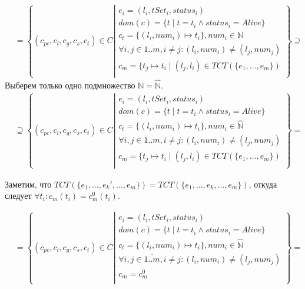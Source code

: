 \begin{align}
& = \left\lbrace (c_{pc},c_l,c_g,c_s, c_t) \in C 
\left| 
\begin{array}{c}
e_i = (l_i, tSet_i, status_i) \\
dom(c) = \{t \mid t = t_i \land status_i = Alive\}\\
c_t = \{(l_i, num_i) \mapsto t_i\}, num_i \in \mathbb{N} \\
\forall i, j \in \overline{1..m}, i \neq j: (l_i, num_i) \neq (l_j, num_j)\\
c_m = \{ t_j \mapsto t_i \mid (l_j, l_i) \in TCT(\{e_1, \dots, e_m\}) \\
\end{array}
\right.
\right\rbrace \supseteq \nonumber
\end{align}
Выберем только одно подмножество $\mathbb{N} = \widehat{\mathbb{N}}$.
\begin{align}
& \supseteq \left\lbrace (c_{pc},c_l,c_g,c_s, c_t) \in C 
\left| 
\begin{array}{c}
e_i = (l_i, tSet_i, status_i) \\
dom(c) = \{t \mid t = t_i \land status_i = Alive\}\\
c_t = \{(l_i, num_i) \mapsto t_i\}, num_i \in \widehat{\mathbb{N}} \\
\forall i, j \in \overline{1..m}, i \neq j: (l_i, num_i) \neq (l_j, num_j)\\
c_m = \{ t_j \mapsto t_i \mid (l_j, l_i) \in TCT(\{e_1, \dots, e_m\}) \\
\end{array}
\right.
\right\rbrace = \nonumber
\end{align}

Заметим, что $TCT(\{e_1, \dots, e_k', \dots, e_m\}) = TCT(\{e_1, \dots, e_k, \dots, e_m\})$, откуда следует $\forall t_i: c_m(t_i) = c^0_m(t_i)$.

\begin{align}
& = \left\lbrace (c_{pc},c_l,c_g,c_s, c_t) \in C 
\left| 
\begin{array}{c}
e_i = (l_i, tSet_i, status_i) \\
dom(c) = \{t \mid t = t_i \land status_i = Alive\}\\
c_t = \{(l_i, num_i) \mapsto t_i\}, num_i \in \widehat{\mathbb{N}} \\
\forall i, j \in \overline{1..m}, i \neq j: (l_i, num_i) \neq (l_j, num_j)\\
c_m = c^0_m \\
\end{array}
\right.
\right\rbrace = \nonumber
\end{align}

